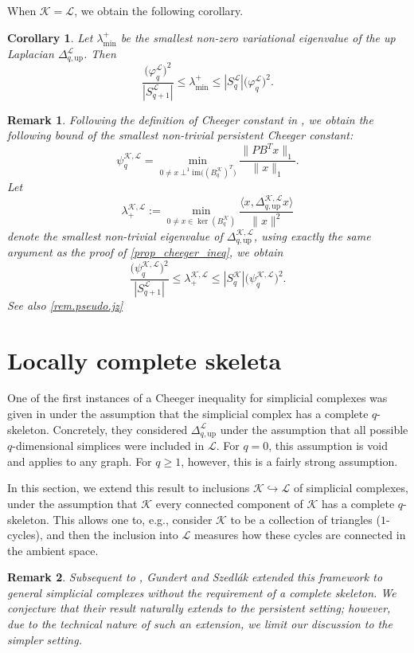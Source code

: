 \documentclass{article}
\newtheorem{corollary}{Corollary}[section]
\newtheorem{remark}{Remark}[section]
\newcommand{\KK}{\mathcal{K}}
\newcommand{\LL}{\mathcal{L}}
\newcommand{\im}{\mathrm{im}}
\begin{document}
When \(\KK=\LL\), we obtain the following corollary.

\begin{corollary}\label{cor:hodge_cheeger_ineq}
Let \(\lambda_{\min}^+\) be the smallest non-zero variational eigenvalue of
the up Laplacian \(\Delta_{q,\mathrm{up}}^{\LL}\). Then
\begin{equation}\label{ineq:hodge_cheeger}
\frac{\bigl(\varphi_q^{\LL}\bigr)^2}{|S_{q+1}^{\LL}|}
\leq
\lambda_{\min}^+
\leq
|S_q^\LL|\bigl(\varphi_q^{\LL}\bigr)^2 .
\end{equation}
\end{corollary}

\begin{remark}
\label{remark.connection.to.jost}
Following the definition of Cheeger constant in \cite{jost2024cheeger},
we obtain the following bound of the smallest \emph{non-trivial} persistent Cheeger constant:
\[
\psi_{q}^{\KK, \LL}
=
\min_{0\neq x\perp^1\im\big((B_q^\KK)^T\big)}\frac{\|PB^T x\|_1}{\|x\|_1}.
\]
Let 
\[\lambda_{+}^{\KK, \LL}
:=
\min_{0 \neq x\in \ker(B_q^\KK)}\frac{\langle x, \Delta_{q, \text{up}}^{\KK, \LL}x\rangle}{\|x\|^2}
\]
denote the smallest \emph{non-trivial} eigenvalue of $\Delta_{q, \text{up}}^{\KK, \LL}$,
using exactly the same argument as 
the proof of \cref{prop_cheeger_ineq},
we obtain 
\[
\frac{\bigl(\psi_q^{\KK,\LL}\bigr)^2}{|S_{q+1}^{\LL}|}
\leq
\lambda_{+}^{\KK, \LL}
\leq
|S_q^\KK|\bigl(\psi_q^{\KK,\LL}\bigr)^2 .
\]
See also \cref{rem.pseudo.jz}
\end{remark}



\section{Locally complete skeleta}\label{sec:loc_cmplt_skl}
One of the first instances of a Cheeger inequality for simplicial complexes was given in \cite{MR3516884} under the assumption that the simplicial complex has a complete $q$-skeleton. Concretely, they considered $\Delta^{\LL}_{q,\mathrm{up}}$ under the assumption that all possible $q$-dimensional simplices were included in $\LL$. For $q=0$, this assumption is void and applies to any graph. For $q\geq 1$, however, this is a fairly strong assumption.

In this section, we extend this result to inclusions $\KK\hookrightarrow \LL$ of simplicial complexes, under the assumption that $\KK$ every connected component of $\KK$ has a complete $q$-skeleton. This allows one to, e.g., consider $\KK$ to be a collection of triangles ($1$-cycles), and then the inclusion into $\LL$ measures how these cycles are connected in the ambient space. 
\begin{remark}
    Subsequent to \cite{MR3516884}, Gundert and Szedl\'ak \cite{MR3382297} extended this framework to general simplicial complexes without the requirement of a complete skeleton. We conjecture that their result naturally extends to the persistent setting; however, due to the technical nature of such an extension, we limit our discussion to the simpler setting.
\end{remark}
\end{document}
